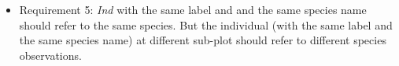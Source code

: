 \documentclass[10pt]{article}
\begin{document}
\begin{itemize}
\item Requirement 5:  {\em Ind} with the same label and and the same species name should refer to the same species.
But the individual (with the same label and the same species name) at different sub-plot should refer to different species observations.
\end{itemize}
\end{document}
